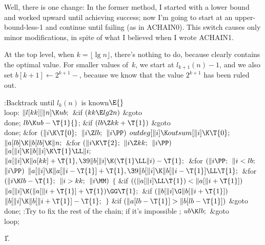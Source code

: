 Well, there is one change: In the former method, I started with a lower
bound and worked upward until achieving success;
now I'm going to start at an upper-bound-less-1 and continue until
failing (as in {\mc ACHAIN0}). This switch causes only minor
modifications, in spite of what I believed when I wrote {\mc ACHAIN1}.

At the top level, when $k=\lfloor\lg n\rfloor$, there's nothing to do,
because  clearly contains the optimal value.
For smaller values of~$k$, we start at $l_{k+1}(n)-1$, and we
also set $b[k+1]\gets2^{k+1}-$, because we know that the value
$2^{k+1}$ has been ruled out.

\Y\B\4:Backtrack until $l_k(n)$ is known\X${}\E{}$\6
\4\\{loop}:\5
${}\|l[\\{kk}][\|n]\K\\{ub};{}$\6
\&{if} ${}(\\{kk}\E\\{lg2n}){}$\1\5
\&{goto} \\{done};\2\6
${}\\{lb}\K\\{ub}-\T{1}{}$;\6
\&{if} ${}(\\{lb}\Z\\{kk}+\T{1}){}$\1\5
\&{goto} \\{done};\2\6
\&{for} ${}(\|i\K\T{0};{}$ ${}\|i\Z\\{lb};{}$ ${}\|i\PP){}$\1\5
${}\\{outdeg}[\|i]\K\\{outsum}[\|i]\K\T{0};{}$\2\6
${}\|a[\\{lb}]\K\|b[\\{lb}]\K\|n;{}$\6
\&{for} ${}(\|i\K\T{2};{}$ ${}\|i\Z\\{kk};{}$ ${}\|i\PP){}$\1\5
${}\|a[\|i]\K\|b[\|i]\K\T{1}\LL\|i;{}$\2\6
${}\|a[\|i]\K\|a[\\{kk}]+\T{1},\39\|b[\|i]\K(\T{1}\LL\|i)-\T{1};{}$\6
\&{for} ${}(\|i\PP;{}$ ${}\|i<\\{lb};{}$ ${}\|i\PP){}$\1\5
${}\|a[\|i]\K\|a[\|i-\T{1}]+\T{1},\39\|b[\|i]\K\|b[\|i-\T{1}]\LL\T{1};{}$\2\6
\&{for} ${}(\|i\K\\{lb}-\T{1};{}$ ${}\|i>\\{kk};{}$ ${}\|i\MM){}$\5
${}\{{}$\1\6
\&{if} ${}((\|a[\|i]\LL\T{1})<\|a[\|i+\T{1}]){}$\1\5
${}\|a[\|i]\K(\|a[\|i+\T{1}]+\T{1})\GG\T{1};{}$\2\6
\&{if} ${}(\|b[\|i]\G\|b[\|i+\T{1}]){}$\1\5
${}\|b[\|i]\K\|b[\|i+\T{1}]-\T{1};{}$\2\6
\4${}\}{}$\2\6
\&{if} ${}(\|a[\\{lb}-\T{1}]>\|b[\\{lb}-\T{1}]){}$\1\5
\&{goto} \\{done};\2\6
:Try to fix the rest of the chain;  if it's impossible%
\X;\6
${}\\{ub}\K\\{lb};{}$\6
\&{goto} \\{loop};\par
\U1.\fi

